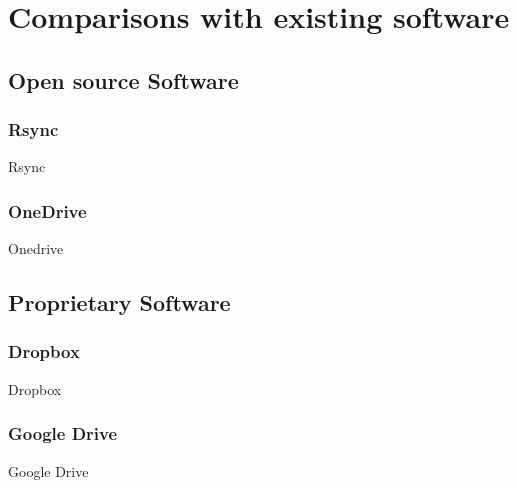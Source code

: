 
\chapter{Comparisons with existing software}


\section{Open source Software}
  \subsection{Rsync}
    Rsync
  \subsection{OneDrive}
    Onedrive
\section{Proprietary Software}
  \subsection{Dropbox}
    Dropbox
  \subsection{Google Drive}
    Google Drive
